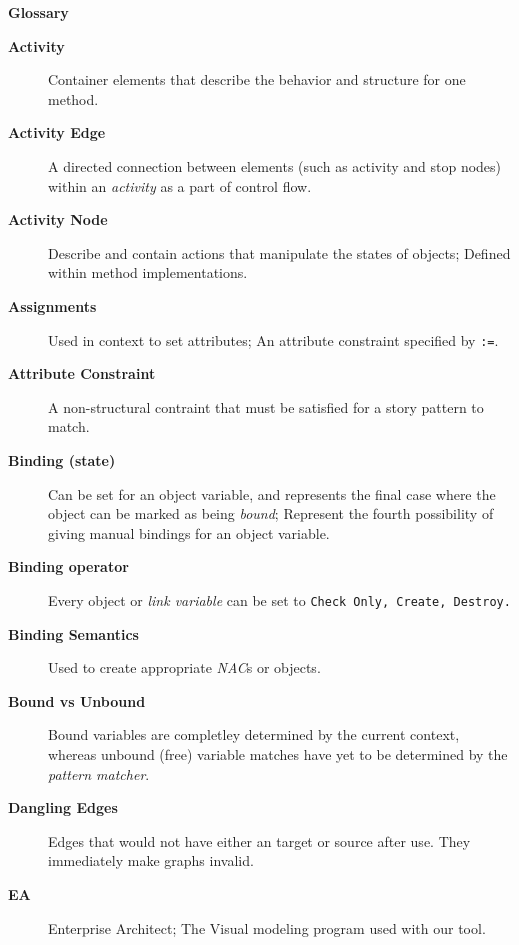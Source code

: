 \newpage
{}
{}
\hypertarget{glossary}{}

\vspace{1cm}
{\Huge \bf Glossary}
\vspace{1cm}

\begin{description}

\item[\bf Activity]
Container elements that describe the behavior and structure for one method.

\item[\bf Activity Edge]
A directed connection between elements (such as activity and stop nodes) within an \emph{activity} as a part of control flow.

\item[\bf Activity Node]
Describe and contain actions that manipulate the states of objects; Defined within method implementations.

\item[\bf Assignments]
Used in context to set attributes; An attribute constraint specified by \texttt{:=}.

\item[\bf Attribute Constraint]
A non-structural contraint that must be satisfied for a story pattern to match.

\item[\bf Binding (state)]
Can be set for an object variable, and represents the final case where the object can be marked as being \emph{bound}; Represent the fourth 
possibility of giving manual bindings for an object variable.

\item[\bf Binding operator]
Every object or \emph{link variable} can be set to \texttt{Check Only, Create, Destroy.}

\item[\bf Binding Semantics]
Used to create appropriate \emph{NAC}s or objects.

\item[\bf Bound vs Unbound]
Bound variables are completley determined by the current context, whereas unbound (free) variable matches have yet to be determined by the \emph{pattern matcher}.

\item[\bf Dangling Edges]
Edges that would not have either an target or source after use. They immediately make graphs invalid.

\item[\bf EA]
Enterprise Architect; The Visual modeling program used with our tool.


\end{description}
